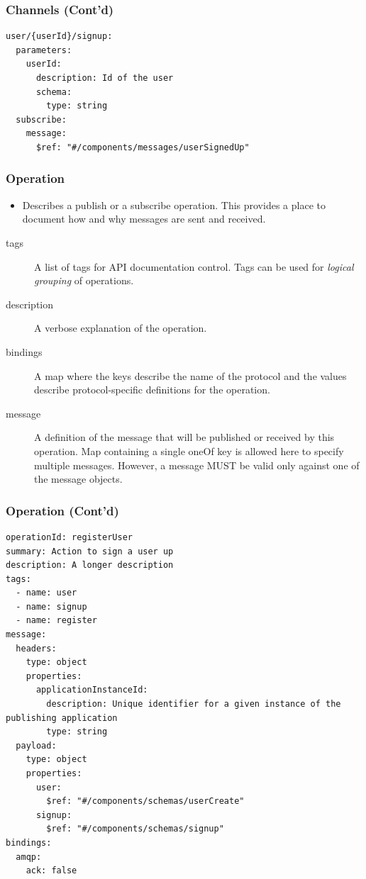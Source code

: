 \documentclass{efd-lecture}
\begin{document}
\begin{frame}[fragile]
  \frametitle{Channels (Cont'd)}
  \scriptsize
  \begin{verbatim}
user/{userId}/signup:
  parameters:
    userId:
      description: Id of the user
      schema:
        type: string
  subscribe:
    message:
      $ref: "#/components/messages/userSignedUp"
  \end{verbatim}
\end{frame}

\begin{frame}[fragile]
  \frametitle{Operation}
  \begin{itemize}
    \item Describes a publish or a subscribe operation. This provides a place to document how and why messages are sent and received.
  \end{itemize}
  \begin{description}
    \item[tags] A list of tags for API documentation control. Tags can be used for \textit{\color{YellowOrange} logical grouping} of operations.
    \item[description] A verbose explanation of the operation.
    \item[bindings] A map where the keys describe the name of the protocol and the values describe protocol-specific definitions for the operation.
    \item[message] A definition of the message that will be published or received by this operation. Map containing a single oneOf key is allowed here to specify multiple messages.
      However, a message MUST be valid only against one of the message objects.
  \end{description}
\end{frame}

\begin{frame}[fragile]
  \frametitle{Operation (Cont'd)}
  \begin{verbatim}
operationId: registerUser
summary: Action to sign a user up
description: A longer description
tags:
  - name: user
  - name: signup
  - name: register
message:
  headers:
    type: object
    properties:
      applicationInstanceId:
        description: Unique identifier for a given instance of the publishing application
        type: string
  payload:
    type: object
    properties:
      user:
        $ref: "#/components/schemas/userCreate"
      signup:
        $ref: "#/components/schemas/signup"
bindings:
  amqp:
    ack: false
  \end{verbatim}
\end{frame}
\end{document}
